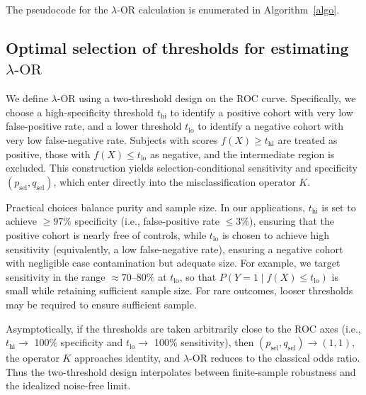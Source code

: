 \documentclass[pdflatex,sn-mathphys-num]{sn-jnl}%
\newcommand{\SPOR}{\textrm{$\lambda$-OR}}
\theoremstyle{thmstyleone}%
\theoremstyle{thmstyletwo}%
\theoremstyle{thmstylethree}%
\begin{document}
The pseudocode for the $\SPOR$ calculation is enumerated in Algorithm~\ref{algo}.

\subsection{Optimal selection of thresholds for estimating $\SPOR$}



We define $\SPOR$ using a two-threshold design on the ROC curve.
Specifically, we choose a high-specificity threshold $t_{\mathrm{hi}}$ to identify
a positive cohort with very low false-positive rate, and a lower threshold
$t_{\mathrm{lo}}$ to identify a negative cohort with very low false-negative rate.
Subjects with scores $f(X) \ge t_{\mathrm{hi}}$ are treated as positive,
those with $f(X) \le t_{\mathrm{lo}}$ as negative, and the intermediate region is excluded.
This construction yields selection-conditional sensitivity and specificity
$(p_{\text{sel}}, q_{\text{sel}})$, which enter directly into the
misclassification operator $K$.

Practical choices balance purity and sample size. In our applications,
$t_{\mathrm{hi}}$ is set to achieve $\geq 97\%$ specificity (i.e., false-positive rate $\le 3\%$), ensuring that the
positive cohort is nearly free of controls, while $t_{\mathrm{lo}}$ is chosen
to achieve high sensitivity (equivalently, a low false-negative rate), ensuring a negative cohort with
negligible case contamination but adequate size. For example, we target sensitivity in the range $\approx 70$--$80\%$ at $t_{\mathrm{lo}}$, so that $P(Y=1\mid f(X)\le t_{\mathrm{lo}})$ is small while retaining sufficient sample size. For rare outcomes, looser
thresholds may be required to ensure sufficient sample.

Asymptotically, if the thresholds are taken arbitrarily close to the ROC axes
(i.e., $t_{\mathrm{hi}} \to$ 100\% specificity and $t_{\mathrm{lo}} \to$ 100\% 
sensitivity), then $(p_{\text{sel}}, q_{\text{sel}}) \to (1,1)$, the operator
$K$ approaches identity, and $\SPOR$ reduces to the classical odds ratio.
Thus the two-threshold design interpolates between finite-sample robustness and the
idealized noise-free limit.




\end{document}
